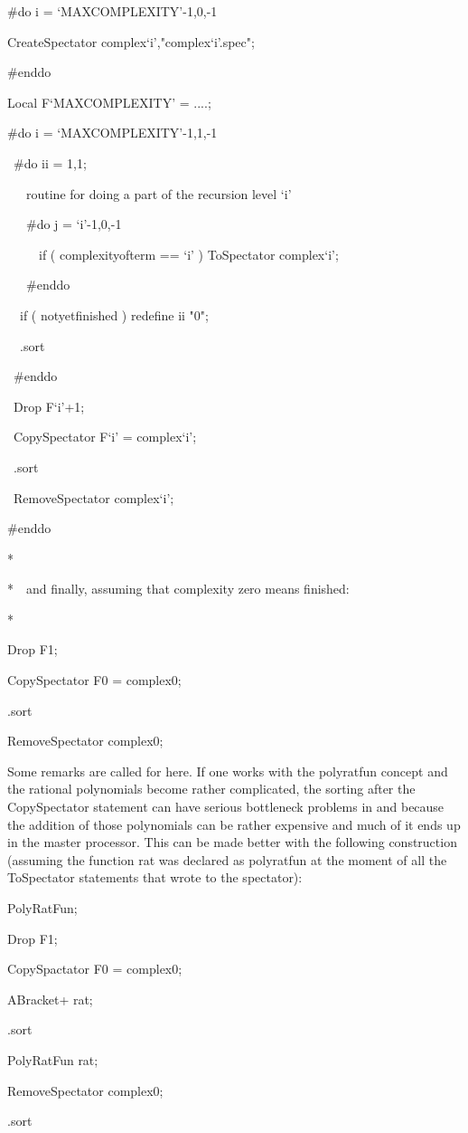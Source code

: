 \begin{minipage}{14cm}
\#do i = `MAXCOMPLEXITY'-1,0,-1

CreateSpectator complex`i',"complex`i'.spec";

\#enddo

Local F`MAXCOMPLEXITY' = ....;

\#do i = `MAXCOMPLEXITY'-1,1,-1

\ \#do ii = 1,1;

\ \ \ routine for doing a part of the recursion level `i'

\ \ \ \#do j = `i'-1,0,-1

\ \ \ \ \ if ( complexityofterm == `i' ) ToSpectator complex`i';

\ \ \ \#enddo

\ \ if ( notyetfinished ) redefine ii "0";

\ \ .sort

\ \#enddo

\ Drop F{`i'+1};

\ CopySpectator F`i' = complex`i';

\ .sort

\ RemoveSpectator complex`i';

\#enddo

*

*\ \ and finally, assuming that complexity zero means finished:

*

Drop F1;

CopySpectator F0 = complex0;

.sort

RemoveSpectator complex0;
\end{minipage}

\noindent
Some remarks are called for here. If one works with the 
polyratfun concept and the rational 
polynomials become rather complicated, the 
sorting after the CopySpectator statement can have serious bottleneck 
problems in \TFORM{} and \ParFORM{} because the 
addition of those polynomials can be rather expensive and much of it ends 
up in the master processor. This can be made better with the following 
construction (assuming the function rat was declared as polyratfun at the 
moment of all the ToSpectator statements that wrote to the spectator):

\begin{minipage}{10cm}
PolyRatFun;

Drop F1;

CopySpactator F0 = complex0;

ABracket+ rat;

.sort

PolyRatFun rat;

RemoveSpectator complex0;

.sort
\end{minipage}

